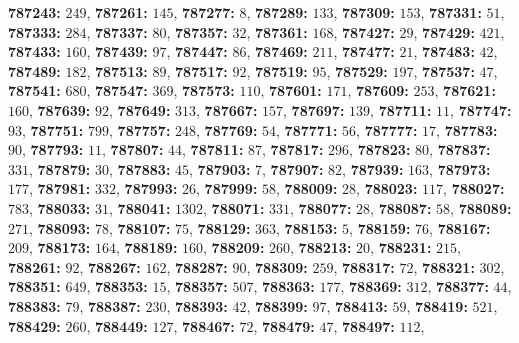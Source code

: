 \textsf{\bfseries 787243:} $249$, \textsf{\bfseries 787261:} $145$, \textsf{\bfseries 787277:} $8$, \textsf{\bfseries 787289:} $133$, \textsf{\bfseries 787309:} $153$, \textsf{\bfseries 787331:} $51$, \textsf{\bfseries 787333:} $284$, \textsf{\bfseries 787337:} $80$, \textsf{\bfseries 787357:} $32$, \textsf{\bfseries 787361:} $168$, \textsf{\bfseries 787427:} $29$, \textsf{\bfseries 787429:} $421$, \textsf{\bfseries 787433:} $160$, \textsf{\bfseries 787439:} $97$, \textsf{\bfseries 787447:} $86$, \textsf{\bfseries 787469:} $211$, \textsf{\bfseries 787477:} $21$, \textsf{\bfseries 787483:} $42$, \textsf{\bfseries 787489:} $182$, \textsf{\bfseries 787513:} $89$, \textsf{\bfseries 787517:} $92$, \textsf{\bfseries 787519:} $95$, \textsf{\bfseries 787529:} $197$, \textsf{\bfseries 787537:} $47$, \textsf{\bfseries 787541:} $680$, \textsf{\bfseries 787547:} $369$, \textsf{\bfseries 787573:} $110$, \textsf{\bfseries 787601:} $171$, \textsf{\bfseries 787609:} $253$, \textsf{\bfseries 787621:} $160$, \textsf{\bfseries 787639:} $92$, \textsf{\bfseries 787649:} $313$, \textsf{\bfseries 787667:} $157$, \textsf{\bfseries 787697:} $139$, \textsf{\bfseries 787711:} $11$, \textsf{\bfseries 787747:} $93$, \textsf{\bfseries 787751:} $799$, \textsf{\bfseries 787757:} $248$, \textsf{\bfseries 787769:} $54$, \textsf{\bfseries 787771:} $56$, \textsf{\bfseries 787777:} $17$, \textsf{\bfseries 787783:} $90$, \textsf{\bfseries 787793:} $11$, \textsf{\bfseries 787807:} $44$, \textsf{\bfseries 787811:} $87$, \textsf{\bfseries 787817:} $296$, \textsf{\bfseries 787823:} $80$, \textsf{\bfseries 787837:} $331$, \textsf{\bfseries 787879:} $30$, \textsf{\bfseries 787883:} $45$, \textsf{\bfseries 787903:} $7$, \textsf{\bfseries 787907:} $82$, \textsf{\bfseries 787939:} $163$, \textsf{\bfseries 787973:} $177$, \textsf{\bfseries 787981:} $332$, \textsf{\bfseries 787993:} $26$, \textsf{\bfseries 787999:} $58$, \textsf{\bfseries 788009:} $28$, \textsf{\bfseries 788023:} $117$, \textsf{\bfseries 788027:} $783$, \textsf{\bfseries 788033:} $31$, \textsf{\bfseries 788041:} $1302$, \textsf{\bfseries 788071:} $331$, \textsf{\bfseries 788077:} $28$, \textsf{\bfseries 788087:} $58$, \textsf{\bfseries 788089:} $271$, \textsf{\bfseries 788093:} $78$, \textsf{\bfseries 788107:} $75$, \textsf{\bfseries 788129:} $363$, \textsf{\bfseries 788153:} $5$, \textsf{\bfseries 788159:} $76$, \textsf{\bfseries 788167:} $209$, \textsf{\bfseries 788173:} $164$, \textsf{\bfseries 788189:} $160$, \textsf{\bfseries 788209:} $260$, \textsf{\bfseries 788213:} $20$, \textsf{\bfseries 788231:} $215$, \textsf{\bfseries 788261:} $92$, \textsf{\bfseries 788267:} $162$, \textsf{\bfseries 788287:} $90$, \textsf{\bfseries 788309:} $259$, \textsf{\bfseries 788317:} $72$, \textsf{\bfseries 788321:} $302$, \textsf{\bfseries 788351:} $649$, \textsf{\bfseries 788353:} $15$, \textsf{\bfseries 788357:} $507$, \textsf{\bfseries 788363:} $177$, \textsf{\bfseries 788369:} $312$, \textsf{\bfseries 788377:} $44$, \textsf{\bfseries 788383:} $79$, \textsf{\bfseries 788387:} $230$, \textsf{\bfseries 788393:} $42$, \textsf{\bfseries 788399:} $97$, \textsf{\bfseries 788413:} $59$, \textsf{\bfseries 788419:} $521$, \textsf{\bfseries 788429:} $260$, \textsf{\bfseries 788449:} $127$, \textsf{\bfseries 788467:} $72$, \textsf{\bfseries 788479:} $47$, \textsf{\bfseries 788497:} $112$, 
